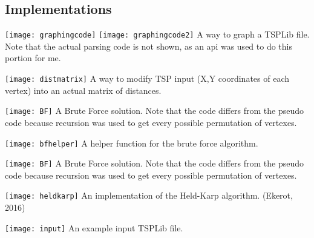 \documentclass[a4paper,titlepage, margin, 11pt]{article}
\numberwithin{equation}{section}
\begin{document}
\begin{appendices}
\section{ Implementations}

\begin{center}
\texttt{[image: graphingcode]}
\texttt{[image: graphingcode2]}
A way to graph a TSPLib file. Note that the actual parsing code is not shown, as an api was used to do this portion for me.
\end{center}

\begin{center}
\texttt{[image: distmatrix]}
A way to modify TSP input (X,Y coordinates of each vertex) into an actual matrix of distances.
\end{center}

\begin{center}
\texttt{[image: BF]}
A Brute Force solution. Note that the code differs from the pseudo code because recursion was used to get every possible permutation of vertexes.
\end{center}

\begin{center}
\texttt{[image: bfhelper]}
A helper function for the brute force algorithm.
\end{center}

\begin{center}
\texttt{[image: BF]}
A Brute Force solution. Note that the code differs from the pseudo code because recursion was used to get every possible permutation of vertexes.
\end{center}

\begin{center}
\texttt{[image: heldkarp]}
An implementation of the Held-Karp algorithm. (Ekerot, 2016)
\end{center}

\begin{center}
\texttt{[image: input]}
An example input TSPLib file.
\end{center}


\end{appendices}
\end{document}
